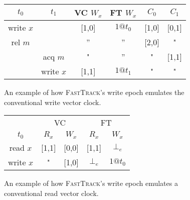 \documentclass[preprint, 10pt]{sigplanconf}
\newcommand{\Tid}{t}
\newcommand{\Address}{x}
\newcommand{\Lock}{m}
\newcommand{\VCFont}{}
\newcommand{\ThreadVC}[1]{\VCFont{C}_{#1}}
\newcommand{\ReadVC}[1]{\VCFont{R}_{#1}}
\newcommand{\WriteVC}[1]{\VCFont{W}_{#1}}
\newcommand{\FT}{\textsc{FastTrack}\xspace}
\newcommand{\EmptyEpoch}{\bot_e}
\begin{document}
\begin{figure}[htb]
\centering


\begin{tabular}{cc|c|c|cc}
$\Tid_0$ & $\Tid_1$ & VC $\WriteVC{\Address}$ & FT $\WriteVC{\Address}$ & $\ThreadVC{0}$ & $\ThreadVC{1}$ \\
\hline
write $\Address$ && [1,0] & $1@t_0$ & [1,0] & [0,1] \\
rel $\Lock$ & &'' &'' & [2,0] & " \\
& acq $\Lock$ & " &'' & " & [1,1] \\
& write $\Address$ & [1,1] & $1@t_1$ & " & " \\
\end{tabular}
\caption{An example of how \FT's write epoch emulates the conventional write vector clock.}
\label{f:encap-writes}
\end{figure}

\begin{figure}[htb]
\centering
\begin{tabular}{c|cc|cc|}
& \multicolumn{2}{c}{VC} & \multicolumn{2}{c}{FT} \\
$\Tid_0$ & $\ReadVC{\Address}$ & $\WriteVC{\Address}$ & $\ReadVC{\Address}$ & $\WriteVC{\Address}$ \\
\hline
read $\Address$ & [1,1] & [0,0] & [1,1] & $\EmptyEpoch$ \\
write $\Address$ & " & [1,0] & $\EmptyEpoch$ & $1@t_0$ \\
\end{tabular}
\caption{An example of how \FT's write epoch emulates a conventional read vector clock.}
\label{f:encap-empty-read}
\end{figure}
\end{document}
